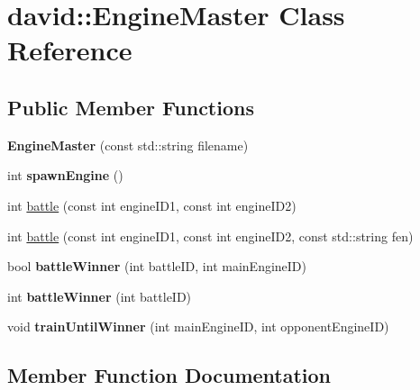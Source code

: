 \hypertarget{classdavid_1_1EngineMaster}{}\section{david\+:\+:Engine\+Master Class Reference}
\label{classdavid_1_1EngineMaster}
\subsection*{Public Member Functions}
\begin{DoxyCompactItemize}
\item 
\mbox{\label{classdavid_1_1EngineMaster_a54cbfc2886ca31ea806b3242b654c5bc}} 
{\bfseries Engine\+Master} (const std\+::string filename)
\item 
\mbox{\label{classdavid_1_1EngineMaster_a48bb11415bf635328bc54dd4db36ff6e}} 
int {\bfseries spawn\+Engine} ()
\item 
int \hyperlink{classdavid_1_1EngineMaster_a37cdf4a685c0fb0e317e94fcc03e6228}{battle} (const int engine\+I\+D1, const int engine\+I\+D2)
\item 
int \hyperlink{classdavid_1_1EngineMaster_a714b4dd5a0ce60b61f0c9f5ad769644d}{battle} (const int engine\+I\+D1, const int engine\+I\+D2, const std\+::string fen)
\item 
\mbox{\label{classdavid_1_1EngineMaster_aa1cde75b83ce9dcf11a5769a5345d1b9}} 
bool {\bfseries battle\+Winner} (int battle\+ID, int main\+Engine\+ID)
\item 
\mbox{\label{classdavid_1_1EngineMaster_a9ef59bd73c1aaee24984e0416acd6ab9}} 
int {\bfseries battle\+Winner} (int battle\+ID)
\item 
\mbox{\label{classdavid_1_1EngineMaster_aa58d33be1b3e3302a2afb57162af0e28}} 
void {\bfseries train\+Until\+Winner} (int main\+Engine\+ID, int opponent\+Engine\+ID)
\end{DoxyCompactItemize}


\subsection{Member Function Documentation}
\mbox{\label{classdavid_1_1EngineMaster_a37cdf4a685c0fb0e317e94fcc03e6228}} 
